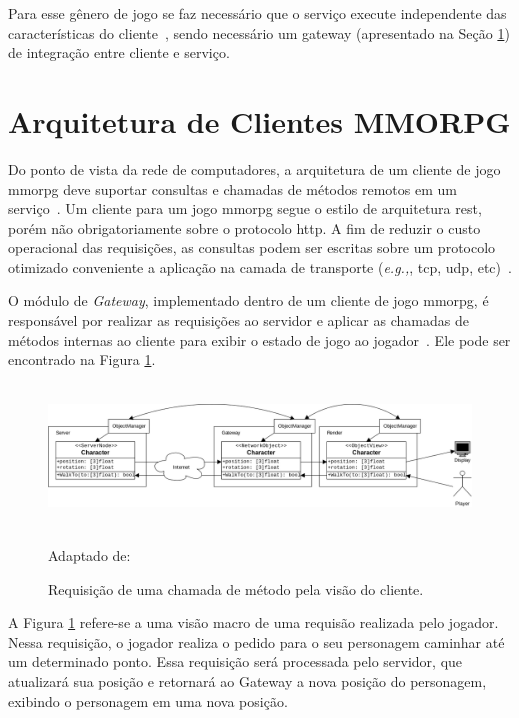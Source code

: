 Para esse gênero de jogo se faz necessário que o serviço execute independente das características do cliente~\cite{albion_online_unite}, sendo necessário um gateway (apresentado na Seção \ref{sec:cliente}) de integração entre cliente e serviço.


\section{Arquitetura de Clientes MMORPG}
\label{sec:cliente}



Do ponto de vista da rede de computadores, a arquitetura de um cliente de jogo \ac{mmorpg} deve suportar consultas e chamadas de métodos remotos em um serviço~\cite{albion_online_unite}.
%
Um cliente para um jogo \ac{mmorpg} segue o estilo de arquitetura \ac{rest}, porém não obrigatoriamente sobre o protocolo \ac{http}. A fim de reduzir o custo operacional das requisições, as consultas podem ser escritas sobre um protocolo otimizado conveniente a aplicação na camada de transporte (\textit{e.g.,}, \ac{tcp}, \ac{udp}, etc)~\cite{albion_online_unite, stephenclarkewillson2017}.

O módulo de \textit{Gateway}, implementado dentro de um cliente de jogo \ac{mmorpg}, é responsável por realizar as requisições ao servidor e aplicar as chamadas de métodos internas ao cliente para exibir o estado de jogo ao jogador~\cite{albion_online_unite}.
%
Ele pode ser encontrado na Figura \ref{fig:gateway}.


\begin{figure}[htb!]
\caption{Requisição de uma chamada de método pela visão do cliente.}
\label{fig:gateway}
\includegraphics[height=3.8cm]{img/cap2/gateway.png}
\centering

Adaptado de:~\cite{albion_online_unite}
\end{figure}



A Figura \ref{fig:gateway} refere-se a uma visão macro de uma requisão realizada pelo jogador.
%
Nessa requisição, o jogador realiza o pedido para o seu personagem caminhar até um determinado ponto.
%
Essa requisição será processada pelo servidor, que atualizará sua posição e retornará ao Gateway a nova posição do personagem, exibindo o personagem em uma nova posição.



